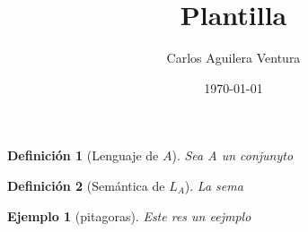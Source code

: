 \documentclass[a4paper]{article}
\title{Plantilla}
\author{Carlos Aguilera Ventura}
\date{\today}
\newtheorem{eje}{Ejemplo}
\newtheorem{defi}{Definición}
\begin{document}
\maketitle 
\begin{defi}[Lenguaje de $A$]
Sea A un conjunyto
\end{defi}
\begin{defi}[Semántica de $L_A$]
La sema
\end{defi}
\begin{eje}[pitagoras]
Este res un eejmplo
\end{eje}
\end{document}
